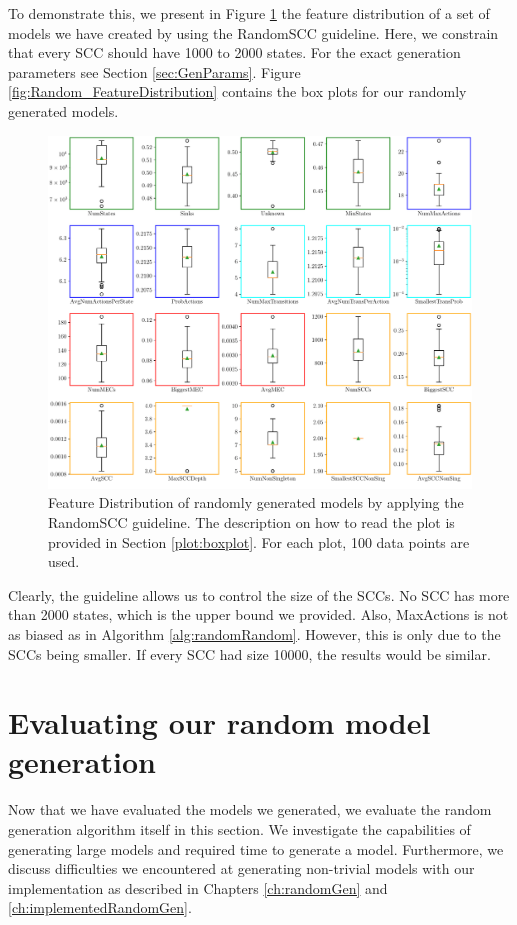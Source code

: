 To demonstrate this, we present in Figure \ref{fig:RandomSCC_FeatureDistributions} the feature distribution of a set of models we have created by using the RandomSCC guideline.
Here, we constrain that every SCC should have 1000 to 2000 states. For the exact generation parameters see Section \ref{sec:GenParams}.
Figure \ref{fig:Random_FeatureDistribution} contains the box plots for our randomly generated models.
\begin{figure}[h!]
    \centering
    \includegraphics[width=1\textwidth]{figures/RandomSCC_FeatureDistribution.pdf}
    \caption[Feature Distribution of randomly generated models with the RandomSCC guideline]{
        Feature Distribution of randomly generated models by applying the RandomSCC guideline. The description on how to read the plot is provided in Section \ref{plot:boxplot}.
        For each plot, 100 data points are used.
    }
    \label{fig:RandomSCC_FeatureDistributions}
\end{figure}
\FloatBarrier

\label{insights:sccDistribution}
Clearly, the guideline allows us to control the size of the SCCs. No SCC has more than 2000 states, which is the upper bound we provided.
Also, MaxActions is not as biased as in Algorithm \ref{alg:randomRandom}. However, this is only due to the SCCs being smaller.
If every SCC had size 10000, the results would be similar.

\section{Evaluating our random model generation}
Now that we have evaluated the models we generated, we evaluate the random generation algorithm itself in this section.
We investigate the capabilities of generating large models and required time to generate a model. Furthermore, we discuss difficulties 
we encountered at generating non-trivial models with our implementation as described in Chapters \ref{ch:randomGen} and \ref{ch:implementedRandomGen}.

